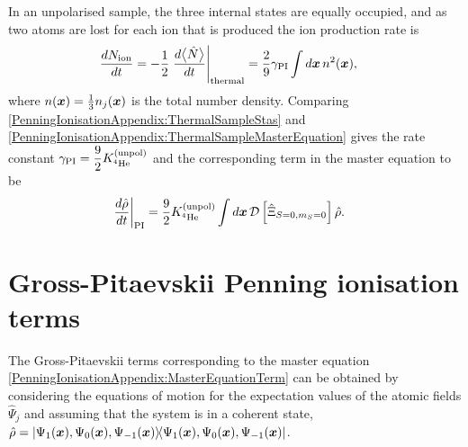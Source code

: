 In an unpolarised sample, the three internal states are equally occupied, and as two atoms are lost for each ion that is produced the ion production rate is
\begin{align}
    \frac{d N_\text{ion}}{dt} &= -\frac{1}{2} \left.\frac{d \mean{\hat{N}}}{dt}\right|_\text{thermal} = \frac{2}{9} \gamma_\text{PI} \int d \vect{x}\, n^2(\vect{x}),
    \label{PenningIonisationAppendix:ThermalSampleMasterEquation}
\end{align}
where $n(\bm{x}) = \frac{1}{3}n_j(\bm{x})$ is the total number density.
Comparing \eqref{PenningIonisationAppendix:ThermalSampleStas} and \eqref{PenningIonisationAppendix:ThermalSampleMasterEquation}  gives the rate constant $\displaystyle\gamma_\text{PI} = \frac{9}{2} K^\text{(unpol)}_{^4\text{He}}$ and the corresponding term in the master equation to be
\begin{align}
    \label{PenningIonisationAppendix:MasterEquationTerm}
    \left.\frac{d \hat{\rho}}{dt}\right|_\text{PI} &= \frac{9}{2} \Kunpol \int d \vect{x}\, \mathcal{D}\left[ \hat{\Xi}_{S=0, m_S=0}\right] \hat{\rho}.
\end{align}

\section{Gross-Pitaevskii Penning ionisation terms}
\label{PenningIonisationAppendix:GP}

The Gross-Pitaevskii terms corresponding to the master equation \eqref{PenningIonisationAppendix:MasterEquationTerm} can be obtained by considering the equations of motion for the expectation values of the atomic fields $\hat{\Psi}_j$ and assuming that the system is in a coherent state, $\displaystyle\hat{\rho} =  \left|\Psi_1(\bm{x}), \Psi_0(\bm{x}), \Psi_{-1}(\bm{x})\middle>\!\middle<\Psi_1(\bm{x}), \Psi_0(\bm{x}), \Psi_{-1}(\bm{x})\right|$.

